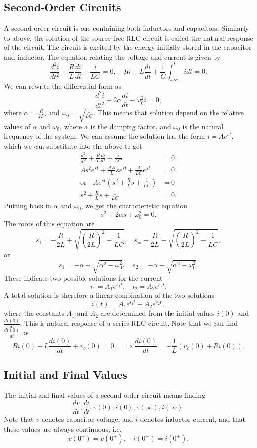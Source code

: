 \documentclass{article}
\begin{document}
\subsection{Second-Order Circuits}
A second-order circuit is one containing both inductors and capacitors. Similarly to above, the solution of the source-free RLC circuit is called the natural response of the circuit. The circuit is excited by the energy initially stored in the capacitor and inductor. The equation relating the voltage and current is given by 
\[
    \frac{d^2i}{d t^2}+\frac{R}{L}\frac{d i}{d t}+\frac{i}{LC}=0,\quad Ri+L \frac{d i}{d t}+\frac{1}{C}\int_{-\infty}^ti dt=0.
\]
We can rewrite the differential form as 
\[
    \frac{d^2i}{d t^2}+2\alpha \frac{d i}{d t}-\omega _0^2i=0,
\]
where $\alpha =\frac{R}{2L}$, and $\omega _0=\sqrt{\frac{1}{LC}}$. This means that solution depend on the relative values of $\alpha $ and $\omega _0$, where $\alpha $ is the damping factor, and $\omega _0$ is the natural frequency of the system. We can assume the solution has the form $i=Ae^{st}$, which we can substitute into the above to get
\begin{align*}
    \frac{d^2i}{d t^2}+\frac{R}{L}\frac{d i}{d t}+\frac{i}{LC} &= 0\\
    As^2e^{st}+\frac{AR}{L}se^{st}+\frac{A}{LC}e^{st}&=0\\
    \text{or}\quad Ae^{st}\left( s^2+\frac{R}{L}s +\frac{1}{LC}\right) &=0\\
    s^2+\frac{R}{L}s+\frac{1}{LC}&=0.
\end{align*}
Putting back in $\alpha $ and $\omega _0$, we get the characteristic equation 
\[
    s^2+2\alpha s+\omega^2_0=0.
\]
The roots of this equation are 
\[
    s_1=-\frac{R}{2L}+\sqrt{\left( \frac{R}{2L} \right)^2-\frac{1}{LC}},\quad s_=-\frac{R}{2L}-\sqrt{\left( \frac{R}{2L} \right)^2-\frac{1}{LC}},
\]
or 
\[
    s_1=-\alpha +\sqrt{\alpha^2-\omega^2_0},\quad s_2=-\alpha -\sqrt{\alpha^2-\omega _0^2}.
\]
These indicate two possible solutions for the current 
\[
    i_1=A_1e^{s_1t},\quad i_2=A_2e^{s_2t}.
\]
A total solution is therefore a linear combination of the two solutions 
\[
    i(t)=A_1e^{s_1t}+A_2e^{s_2t},
\]
where the constants $A_1$ and $A_2$ are determined from the initial values $i(0)$ and $\frac{d i(0)}{d t}$. This is natural response of a series RLC circuit. Note that we can find $\frac{d i(0)}{d t}$ as 
\[
    Ri(0)+L \frac{d i(0)}{d t}+v_c(0)=0,\quad\Rightarrow \frac{d i(0)}{d t}=-\frac{1}{L}\left( v_c(0)+Ri(0) \right).
\]

\subsection{Initial and Final Values}
The initial and final values of a second-order circuit means finding 
\[
    \frac{d v}{d t},\frac{d i}{d t},v(0),i(0),v(\infty),i(\infty).
\]
Note that $v$ denotes capacitor voltage, and $i$ denotes inductor current, and that these values are always continuous, i.e. 
\[
    v(0^-)=v(0^+),\quad i(0^-)=i(0^+).
\]
\end{document}
